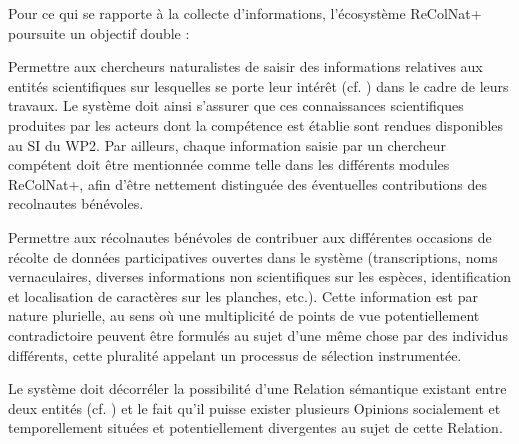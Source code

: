 \startchapter[title={Opinions & autorité}]

\startsection[title={Enjeux}]

Pour ce qui se rapporte à la collecte d'informations, l'écosystème ReColNat+ poursuite un objectif double :

\startitemize
	\item
	Permettre aux chercheurs naturalistes de saisir des informations relatives aux entités scientifiques sur lesquelles se porte leur intérêt (cf. ) dans le cadre de leurs travaux.
	Le système doit ainsi s'assurer que ces connaissances scientifiques produites par les acteurs dont la compétence est établie sont rendues disponibles au SI du WP2.
	Par ailleurs, chaque information saisie par un chercheur compétent doit être mentionnée comme telle dans les différents modules ReColNat+, afin d'être nettement distinguée des éventuelles contributions des recolnautes bénévoles.
	\item
	Permettre aux récolnautes bénévoles de contribuer aux différentes occasions de récolte de données participatives ouvertes dans le système (transcriptions, noms vernaculaires, diverses informations non scientifiques sur les espèces, identification et localisation de caractères sur les planches, etc.).
	Cette information est par nature plurielle, au sens où une multiplicité de points de vue potentiellement contradictoire peuvent être formulés au sujet d'une même chose par des individus différents, cette pluralité appelant un processus de sélection instrumentée.
\stopitemize

\startsection[title={Représentation de la contribution}]

\startsubsection[title={Notions de Relation et d'Opinion},reference=s:relopi]

\fon{}
Le système doit décorréler la possibilité d'une Relation sémantique existant entre deux entités (cf. ) et le fait qu'il puisse exister plusieurs Opinions socialement et temporellement situées et potentiellement divergentes au sujet de cette Relation.

